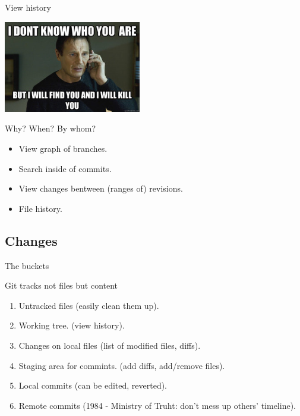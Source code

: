 \documentclass{beamer}
\begin{document}
\begin{frame}{View history}

\begin{center}
 \includegraphics[height=4cm]{taken.jpg}
\end{center}

\begin{block}{Why? When? By whom?}
\begin{itemize}
 \item View graph of branches.
 \item Search inside of commits.
 \item View changes bentween (ranges of) revisions.
 \item File history.
\end{itemize}
\end{block}

\end{frame}


\subsection{Changes}

\begin{frame}{The buckets}

\begin{block}{Git tracks not files but content}
\begin{enumerate}
 \item Untracked files (easily clean them up).
 \item Working tree. (view history).
 \item Changes on local files (list of modified files, diffs).
 \item Staging area for commints. (add diffs, add/remove files).
 \item Local commits (can be edited, reverted).
 \item Remote commits (1984 - Ministry of Truht: don't mess up others' timeline).
\end{enumerate}
\end{block}

\end{frame}
\end{document}

